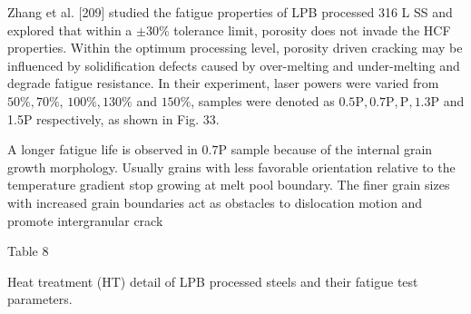 \documentclass[10pt]{article}
\begin{document}
Zhang et al. [209] studied the fatigue properties of LPB processed 316 L SS and explored that within a $\pm 30 \%$ tolerance limit, porosity does not invade the HCF properties. Within the optimum processing level, porosity driven cracking may be influenced by solidification defects caused by over-melting and under-melting and degrade fatigue resistance. In their experiment, laser powers were varied from $50 \%, 70 \%$, $100 \%, 130 \%$ and $150 \%$, samples were denoted as $0.5 \mathrm{P}, 0.7 \mathrm{P}, \mathrm{P}, 1.3 \mathrm{P}$ and 1.5P respectively, as shown in Fig. 33.

A longer fatigue life is observed in $0.7 \mathrm{P}$ sample because of the internal grain growth morphology. Usually grains with less favorable orientation relative to the temperature gradient stop growing at melt pool boundary. The finer grain sizes with increased grain boundaries act as obstacles to dislocation motion and promote intergranular crack

Table 8

Heat treatment (HT) detail of LPB processed steels and their fatigue test parameters.
\end{document}

